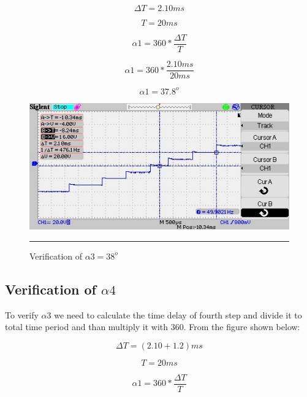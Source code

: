 \begin{equation}
\Delta T = 2.10ms
\end{equation}

\begin{equation}
T = 20ms
\end{equation}

\begin{equation}
\alpha1 = 360*\frac{\Delta T}{T}
\end{equation}

\begin{equation}
\alpha1 = 360*\frac{2.10ms}{20ms}
\end{equation}

\begin{equation}
\alpha1 = 37.8^o
\end{equation}

\begin{figure}[htbp]
	\centering
	\includegraphics[width = 6in]{./Figures/Photos/Hardware/23}
	\rule{35em}{1pt}
	\caption{Verification of $\alpha3 = 38^o$}
\end{figure}

\newpage
\subsection{Verification of $\alpha4$ }
To verify $\alpha3$ we need to calculate the time delay of fourth step and divide it to total time period and than multiply it with 360.
From the figure shown below:

\begin{equation}
\Delta T = (2.10 + 1.2)ms
\end{equation}

\begin{equation}
T = 20ms
\end{equation}

\begin{equation}
\alpha1 = 360*\frac{\Delta T}{T}
\end{equation}

